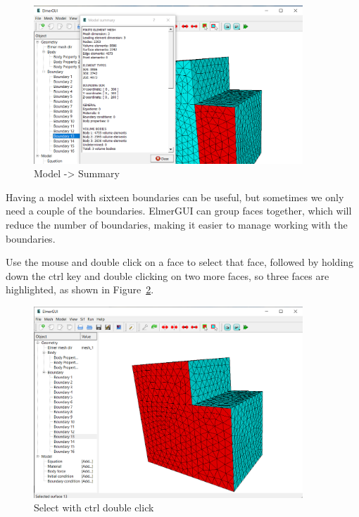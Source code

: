\begin{figure}[H]
\centering
\includegraphics[width=0.9\textwidth]{elmergui-3}
\caption{Model -> Summary}\label{fg:elmergui-3}
\end{figure}

Having a model with sixteen boundaries can be useful, but sometimes we only need a couple of the boundaries.  ElmerGUI can group faces together, which will reduce the number of boundaries, making it easier to manage working with the boundaries.\\

\newpage

Use the mouse and double click on a face to select that face, followed by holding down the ctrl key and double clicking on two more faces, so three faces are highlighted, as shown in Figure~\ref{fg:elmergui-4}.

\begin{figure}[H]
\centering
\includegraphics[width=0.9\textwidth]{elmergui-4}
\caption{Select with ctrl double click}\label{fg:elmergui-4}
\end{figure}

